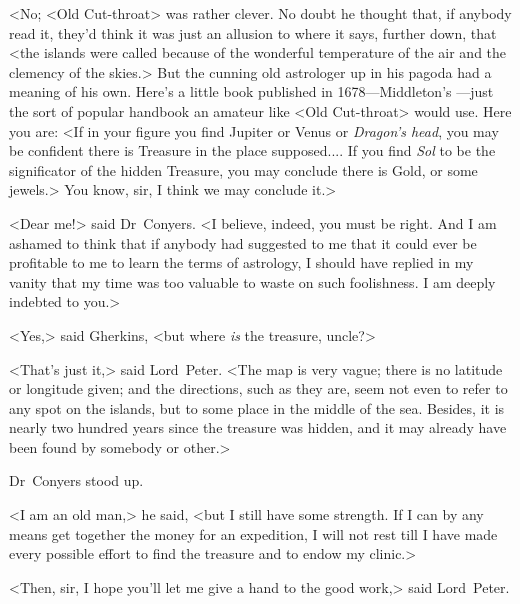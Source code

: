 <No; <Old Cut-throat> was rather clever. No doubt he thought that, if anybody read it, they'd think it was just an allusion to where it says, further down, that <the islands were called  because of the wonderful temperature of the air and the clemency of the skies.> But the cunning old astrologer up in his pagoda had a meaning of his own. Here's a little book published in 1678—Middleton's —just the sort of popular handbook an amateur like <Old Cut-throat> would use. Here you are: <If in your figure you find Jupiter or Venus or \emph{Dragon's head}, you may be confident there is Treasure in the place supposed.... If you find \emph{Sol} to be the significator of the hidden Treasure, you may conclude there is Gold, or some jewels.> You know, sir, I think we may conclude it.>

<Dear me!> said Dr~Conyers. <I believe, indeed, you must be right. And I am ashamed to think that if anybody had suggested to me that it could ever be profitable to me to learn the terms of astrology, I should have replied in my vanity that my time was too valuable to waste on such foolishness. I am deeply indebted to you.>

<Yes,> said Gherkins, <but where \textit{is} the treasure, uncle?>

<That's just it,> said Lord~Peter. <The map is very vague; there is no latitude or longitude given; and the directions, such as they are, seem not even to refer to any spot on the islands, but to some place in the middle of the sea. Besides, it is nearly two hundred years since the treasure was hidden, and it may already have been found by somebody or other.>

Dr~Conyers stood up.

<I am an old man,> he said, <but I still have some strength. If I can by any means get together the money for an expedition, I will not rest till I have made every possible effort to find the treasure and to endow my clinic.>

<Then, sir, I hope you'll let me give a hand to the good work,> said Lord~Peter.

\divider

